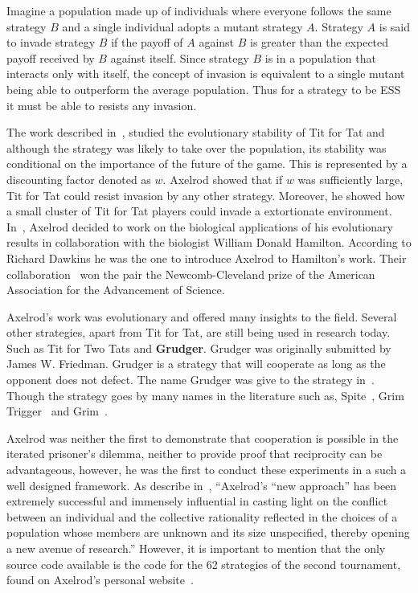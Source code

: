 \documentclass{article}
\theoremstyle{definition}
\begin{document}
Imagine a population made up of individuals where everyone follows the
same strategy \(B\) and a single individual adopts a mutant strategy \(A\).
Strategy \(A\) is said to invade strategy \(B\) if the payoff of \(A\) against \(B\)
is greater than the expected payoff received by \(B\) against itself.
Since strategy \(B\) is in a population that interacts only with itself,
the concept of invasion is equivalent to a single mutant being able to outperform
the average population. Thus for a strategy to be ESS it must be able to resists
any invasion.

The work described in~\cite{axelrod1981}, studied the evolutionary stability of
Tit for Tat and although the strategy was likely to take over the population, its
stability was conditional on the importance of the future of the game. This is
represented by a discounting factor denoted as \(w\). Axelrod showed that if \(w\)
was sufficiently large, Tit for Tat could resist invasion by any other strategy.
Moreover, he showed how a small cluster of Tit for Tat players could invade a extortionate
environment.
In~\cite{Axelrod1984}, Axelrod decided to work on the biological applications of
his evolutionary results in collaboration with the biologist William Donald Hamilton.
According to Richard Dawkins he was the one to introduce Axelrod to Hamilton's work.
Their collaboration~\cite{Axelrod1984} won the pair the Newcomb-Cleveland prize
of the American Association for the Advancement of Science.

Axelrod's work was evolutionary and offered many insights to the field. Several
other strategies, apart from Tit for Tat, are still being
used in research today. Such as Tit for Two Tats and \textbf{Grudger}.
Grudger was originally submitted by James W. Friedman. Grudger is a strategy that
will cooperate as long as the opponent does not defect. The name Grudger was give
to the strategy in~\cite{Li2014}. Though the strategy goes by many names in the
literature such as, Spite~\cite{Beaufils1997}, Grim Trigger~\cite{Banks1990} and
Grim~\cite{Van2015}.

Axelrod was neither the first to demonstrate that cooperation is possible
in the iterated prisoner's dilemma, neither to provide proof that reciprocity can
be advantageous, however, he was the first to conduct these experiments
in a such a well designed framework. As describe in~\cite{Rapoport2015},
``Axelrod's “new approach” has been extremely successful and immensely
influential in casting light on the conflict between an individual and the collective
rationality reflected in the choices of a population whose members are unknown
and its size unspecified, thereby opening a new avenue of research.''
However, it is important to mention that the only source code available is the code
for the 62 strategies of the second tournament, found on Axelrod's personal
website~\cite{fortan_code}.
\end{document}
